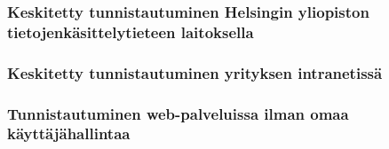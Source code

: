 

\subsubsection{Keskitetty tunnistautuminen Helsingin yliopiston tietojenkäsittelytieteen laitoksella}


\subsubsection{Keskitetty tunnistautuminen yrityksen intranetissä}


\subsubsection{Tunnistautuminen web-palveluissa ilman omaa käyttäjähallintaa}
